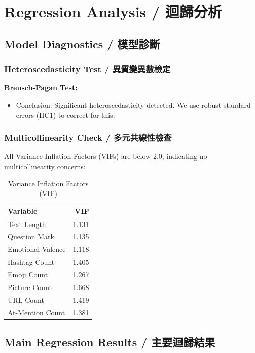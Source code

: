 \documentclass[12pt,a4paper]{article}
\begin{document}
\newpage

\section{Regression Analysis / 迴歸分析}

\subsection{Model Diagnostics / 模型診斷}

\subsubsection{Heteroscedasticity Test / 異質變異數檢定}

\textbf{Breusch-Pagan Test:}
\begin{itemize}
    \item Conclusion: Significant heteroscedasticity detected. We use robust standard errors (HC1) to correct for this.
\end{itemize}

\subsubsection{Multicollinearity Check / 多元共線性檢查}

All Variance Inflation Factors (VIFs) are below 2.0, indicating no multicollinearity concerns:

\begin{table}[H]
\centering
\caption{Variance Inflation Factors (VIF)}
\small
\begin{tabular}{lr}
\toprule
Variable & VIF \\
\midrule
Text Length & 1.131 \\
Question Mark & 1.135 \\
Emotional Valence & 1.118 \\
Hashtag Count & 1.405 \\
Emoji Count & 1.267 \\
Picture Count & 1.668 \\
URL Count & 1.419 \\
At-Mention Count & 1.381 \\
\bottomrule
\end{tabular}
\end{table}

\subsection{Main Regression Results / 主要迴歸結果}
\end{document}
